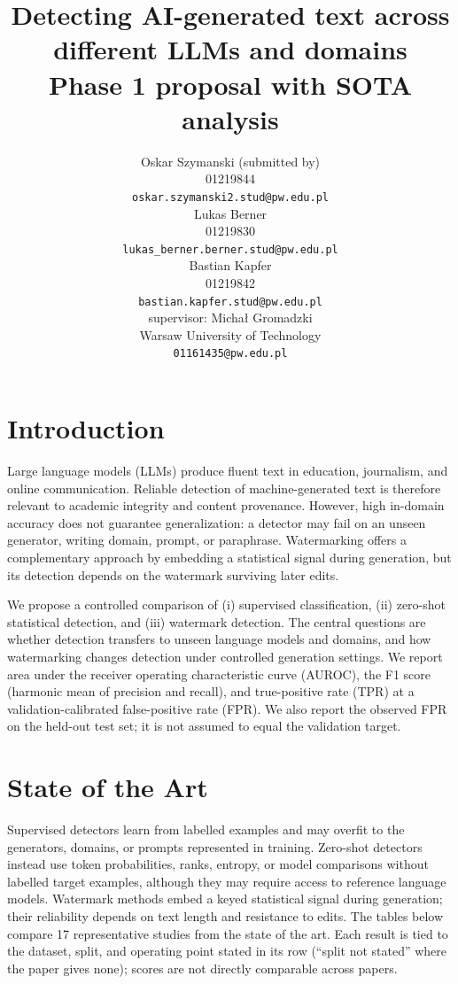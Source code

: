 \documentclass[11pt]{article}
\title{Detecting AI-generated text across different LLMs and domains\\Phase 1 proposal with SOTA analysis}
\author{Oskar Szymanski (submitted by) \\
  01219844 \\
  {\scriptsize\tt oskar.szymanski2.stud@pw.edu.pl} \\\And
  Lukas Berner \\
  01219830 \\
  {\scriptsize\tt lukas\_berner.berner.stud@pw.edu.pl} \\ \And
  Bastian Kapfer \\
  01219842 \\
  {\scriptsize\tt bastian.kapfer.stud@pw.edu.pl} \\ \AND
  supervisor: Michał Gromadzki\\
  Warsaw University of Technology \\
  {\tt 01161435@pw.edu.pl}}
\date{}
\begin{document}
\maketitle

\section{Introduction}
Large language models (LLMs) produce fluent text in education, journalism, and online communication. Reliable detection of machine-generated text is therefore relevant to academic integrity and content provenance. However, high in-domain accuracy does not guarantee generalization: a detector may fail on an unseen generator, writing domain, prompt, or paraphrase. Watermarking offers a complementary approach by embedding a statistical signal during generation, but its detection depends on the watermark surviving later edits.

We propose a controlled comparison of (i) supervised classification, (ii) zero-shot statistical detection, and (iii) watermark detection. The central questions are whether detection transfers to unseen language models and domains, and how watermarking changes detection under controlled generation settings. We report area under the receiver operating characteristic curve (AUROC), the F1 score (harmonic mean of precision and recall), and true-positive rate (TPR) at a validation-calibrated false-positive rate (FPR). We also report the observed FPR on the held-out test set; it is not assumed to equal the validation target.

\section{State of the Art}
\label{sec:sota}
Supervised detectors learn from labelled examples and may overfit to the generators, domains, or prompts represented in training. Zero-shot detectors instead use token probabilities, ranks, entropy, or model comparisons without labelled target examples, although they may require access to reference language models. Watermark methods embed a keyed statistical signal during generation; their reliability depends on text length and resistance to edits. The tables below compare 17 representative studies from the state of the art. Each result is tied to the dataset, split, and operating point stated in its row (``split not stated'' where the paper gives none); scores are not directly comparable across papers.
\end{document}
